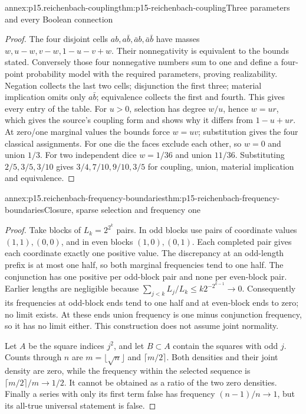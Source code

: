 \begin{annexitem}{annex:p15.reichenbach-coupling}{thm:p15-reichenbach-coupling}{Three parameters and every Boolean connection}
\begin{proof}
The four disjoint cells \(ab,a\bar b,\bar a b,\bar a\bar b\)
have masses \(w,u-w,v-w,1-u-v+w\). Their nonnegativity is
equivalent to the bounds stated. Conversely those four nonnegative
numbers sum to one and define a four-point probability model with
the required parameters, proving realizability. Negation collects the
last two cells; disjunction the first three; material implication omits
only \(a\bar b\); equivalence collects the first and fourth.
This gives every entry of the table. For \(u>0\), selection has
degree \(w/u\), hence \(w=ur\), which gives the source's
coupling form and shows why it differs from \(1-u+ur\).
At zero/one marginal values the bounds force \(w=uv\);
substitution gives the four classical assignments. For one die the
faces exclude each other, so \(w=0\) and union \(1/3\).
For two independent dice \(w=1/36\) and union \(11/36\).
Substituting \(2/5,3/5,3/10\) gives \(3/4,7/10,9/10,3/5\)
for coupling, union, material implication and equivalence.
\end{proof}
\end{annexitem}

\begin{annexitem}{annex:p15.reichenbach-frequency-boundaries}{thm:p15-reichenbach-frequency-boundaries}{Closure, sparse selection and frequency one}
\begin{proof}
Take blocks of \(L_k=2^{2^k}\) pairs. In odd blocks use pairs
of coordinate values \((1,1),(0,0)\), and in even blocks
\((1,0),(0,1)\). Each completed pair gives each coordinate
exactly one positive value. The discrepancy at an odd-length prefix
is at most one half, so both marginal frequencies tend to one half.
The conjunction has one positive per odd-block pair and none per
even-block pair. Earlier lengths are negligible because
\(\sum_{j<k}L_j/L_k\leq k2^{-2^{k-1}}\to0\).
Consequently its frequencies at odd-block ends tend to one half and
at even-block ends to zero; no limit exists. At these ends union
frequency is one minus conjunction frequency, so it has no limit
either. This construction does not assume joint normality.

Let \(A\) be the square indices \(j^2\), and let \(B\subset A\)
contain the squares with odd \(j\). Counts through \(n\) are
\(m=\lfloor\sqrt n\rfloor\) and \(\lceil m/2\rceil\).
Both densities and their joint density are zero, while the frequency
within the selected sequence is \(\lceil m/2\rceil/m\to1/2\).
It cannot be obtained as a ratio of the two zero densities. Finally
a series with only its first term false has frequency
\((n-1)/n\to1\), but its all-true universal statement is false.
\end{proof}
\end{annexitem}

